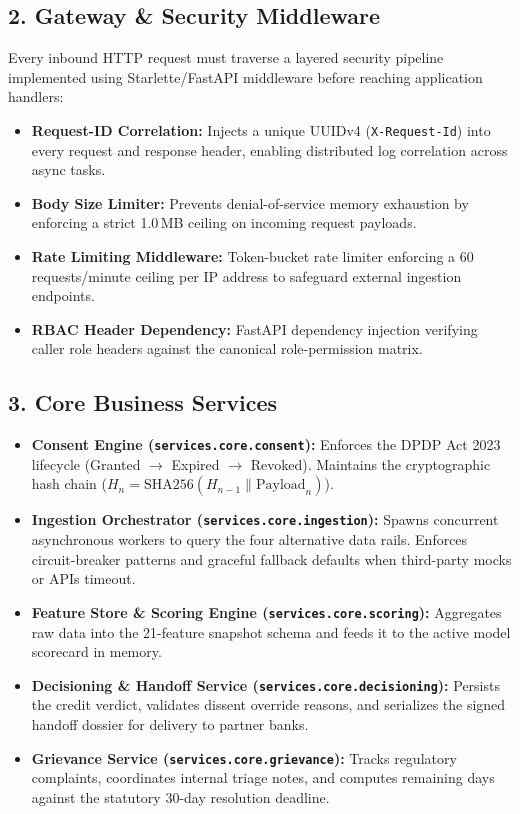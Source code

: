 \documentclass[11pt,a4paper,oneside]{report}
\begin{document}
\subsection{2. Gateway \& Security Middleware}
Every inbound HTTP request must traverse a layered security pipeline implemented using Starlette/FastAPI middleware before reaching application handlers:
\begin{itemize}
  \item \textbf{Request-ID Correlation:} Injects a unique UUIDv4 (\texttt{X-Request-Id}) into every request and response header, enabling distributed log correlation across async tasks.
  \item \textbf{Body Size Limiter:} Prevents denial-of-service memory exhaustion by enforcing a strict 1.0\,MB ceiling on incoming request payloads.
  \item \textbf{Rate Limiting Middleware:} Token-bucket rate limiter enforcing a 60 requests/minute ceiling per IP address to safeguard external ingestion endpoints.
  \item \textbf{RBAC Header Dependency:} FastAPI dependency injection verifying caller role headers against the canonical role-permission matrix.
\end{itemize}

\subsection{3. Core Business Services}
\begin{itemize}
  \item \textbf{Consent Engine (\texttt{services.core.consent}):} Enforces the DPDP Act 2023 lifecycle (Granted $\rightarrow$ Expired $\rightarrow$ Revoked). Maintains the cryptographic hash chain ($H_n = \text{SHA256}(H_{n-1} \parallel \text{Payload}_n)$).
  \item \textbf{Ingestion Orchestrator (\texttt{services.core.ingestion}):} Spawns concurrent asynchronous workers to query the four alternative data rails. Enforces circuit-breaker patterns and graceful fallback defaults when third-party mocks or APIs timeout.
  \item \textbf{Feature Store \& Scoring Engine (\texttt{services.core.scoring}):} Aggregates raw data into the 21-feature snapshot schema and feeds it to the active model scorecard in memory.
  \item \textbf{Decisioning \& Handoff Service (\texttt{services.core.decisioning}):} Persists the credit verdict, validates dissent override reasons, and serializes the signed handoff dossier for delivery to partner banks.
  \item \textbf{Grievance Service (\texttt{services.core.grievance}):} Tracks regulatory complaints, coordinates internal triage notes, and computes remaining days against the statutory 30-day resolution deadline.
\end{itemize}
\end{document}
